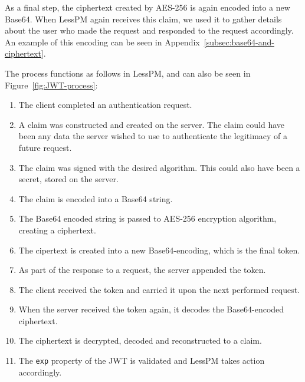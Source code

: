 As a final step, the ciphertext created by AES-256 is again encoded into a
new Base64.
When LessPM again receives this claim, we used it to gather details about the
user who made the request and responded to the request accordingly.
An example of this encoding can be seen in
Appendix~\ref{subsec:base64-and-ciphertext}.

The process functions as follows in LessPM, and can also be seen in
Figure~\ref{fig:JWT-process}:
\begin{enumerate}
  \item The client completed an authentication request.
  \item A claim was constructed and created on the server.
  The claim could have been any data the server wished to use to authenticate
  the legitimacy of a future request.
  \item The claim was signed with the desired algorithm.
  This could also have been a secret, stored on the server.
  \item The claim is encoded into a Base64 string.
  \item The Base64 encoded string is passed to AES-256 encryption algorithm,
  creating a ciphertext.
  \item The cipertext is created into a new Base64-encoding, which is the
  final token.
  \item As part of the response to a request, the server appended the
  token.
  \item The client received the token and carried it upon the next performed
  request.
  \item When the server received the token again, it decodes the
  Base64-encoded ciphertext.
  \item The ciphertext is decrypted, decoded and reconstructed to a claim.
  \item The \texttt{exp} property of the JWT is validated and LessPM takes
  action accordingly.
\end{enumerate}

